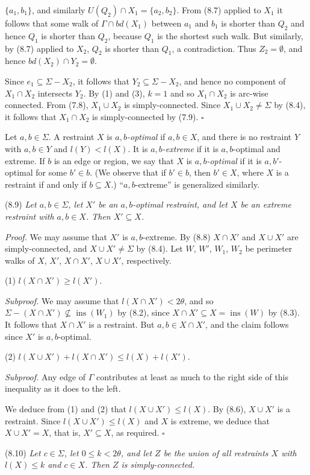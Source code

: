 \noindent $\{a_1, b_1\}$, and similarly $U(Q_2) \cap X_1 = \{a_2, b_2\}$. From (8.7) applied to $X_1$ it follows that some walk of $\Gamma \cap bd(X_1)$ between $a_1$ and $b_1$ is shorter than $Q_2$ and hence $Q_1$ is shorter than $Q_2$, because $Q_1$ is the shortest such walk. But similarly, by (8.7) applied to $X_2$, $Q_2$ is shorter than $Q_1$, a contradiction. Thus $Z_2 = \emptyset$, and hence $bd(X_2) \cap Y_2 = \emptyset$.

Since $e_1 \subseteq \Sigma - X_2$, it follows that $Y_2 \subseteq \Sigma - X_2$, and hence no component of $X_1 \cap X_2$ intersects $Y_2$. By (1) and (3), $k = 1$ and so $X_1 \cap X_2$ is arc-wise connected. From (7.8), $X_1 \cup X_2$ is simply-connected. Since $X_1 \cup X_2 \ne \Sigma$ by (8.4), it follows that $X_1 \cap X_2$ is simply-connected by (7.9). $\square$

Let $a, b \in \Sigma$. A restraint $X$ is \textit{$a, b$-optimal} if $a, b \in X$, and there is no restraint $Y$ with $a, b \in Y$ and $l(Y) < l(X)$. It is \textit{$a, b$-extreme} if it is $a, b$-optimal and extreme. If $b$ is an edge or region, we say that $X$ is \textit{$a, b$-optimal} if it is $a, b'$-optimal for some $b' \in b$. (We observe that if $b' \in b$, then $b' \in X$, where $X$ is a restraint if and only if $b \subseteq X$.) ``$a, b$-extreme'' is generalized similarly.

\stmt
(8.9) \textit{Let $a, b \in \Sigma$, let $X'$ be an $a, b$-optimal restraint, and let $X$ be an extreme restraint with $a, b \in X$. Then $X' \subseteq X$.}

\textit{Proof.} We may assume that $X'$ is $a, b$-extreme. By (8.8) $X \cap X'$ and $X \cup X'$ are simply-connected, and $X \cup X' \ne \Sigma$ by (8.4). Let $W$, $W'$, $W_1$, $W_2$ be perimeter walks of $X$, $X'$, $X \cap X'$, $X \cup X'$, respectively.

\hspace*{12pt}(1) $l(X \cap X') \ge l(X')$.

\textit{Subproof.} We may assume that $l(X \cap X') < 2\theta$, and so $\Sigma - (X \cap X') \nsubseteq \operatorname{ins}(W_1)$ by (8.2), since $X \cap X' \subseteq X = \operatorname{ins}(W)$ by (8.3). It follows that $X \cap X'$ is a restraint. But $a, b \in X \cap X'$, and the claim follows since $X'$ is $a, b$-optimal.

\hspace*{12pt}(2) $l(X \cup X') + l(X \cap X') \le l(X) + l(X')$.

\textit{Subproof.} Any edge of $\Gamma$ contributes at least as much to the right side of this inequality as it does to the left.

We deduce from (1) and (2) that $l(X \cup X') \le l(X)$. By (8.6), $X \cup X'$ is a restraint. Since $l(X \cup X') \le l(X)$ and $X$ is extreme, we deduce that $X \cup X' = X$, that is, $X' \subseteq X$, as required. $\square$

\stmt
(8.10) \textit{Let $c \in \Sigma$, let $0 \le k < 2\theta$, and let $Z$ be the union of all restraints $X$ with $l(X) \le k$ and $c \in X$. Then $Z$ is simply-connected.}
